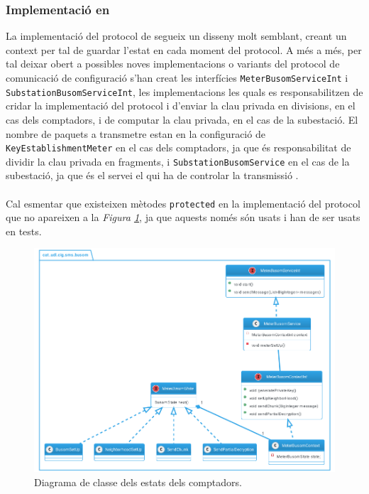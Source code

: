 \subsubsection{Implementació en \cite{busom}}
La implementació del protocol de \cite{busom} segueix un disseny molt semblant, creant un context per tal de guardar l'estat en cada moment del protocol. A més a més, per tal deixar obert a possibles noves implementacions o variants del protocol de comunicació de configuració s'han creat les interfícies \texttt{MeterBusomServiceInt} i \texttt{SubstationBusomServiceInt}, les implementacions les quals es responsabilitzen de cridar la implementació del protocol i d'enviar la clau privada en divisions, en el cas dels comptadors, i de computar la clau privada, en el cas de la subestació. El nombre de paquets a transmetre estan en la configuració de \texttt{KeyEstablishmentMeter} en el cas dels comptadors, ja que és responsabilitat de \cite{recsi} dividir la clau privada en fragments, i \texttt{SubstationBusomService} en el cas de la subestació, ja que és el servei el qui ha de controlar la transmissió \cite{busom}.
\\
\\
Cal esmentar que existeixen mètodes \texttt{protected} en la implementació del protocol que no apareixen a la \textit{Figura \ref{fig:diss-busom}}, ja que aquests només són usats i han de ser usats en tests.
\begin{figure}[H]
	\centering
	\includegraphics[width=14cm]{classes/busomprot.png}
	\caption{Diagrama de classe dels estats dels comptadors.}
	\label{fig:diss-busom}
\end{figure}
